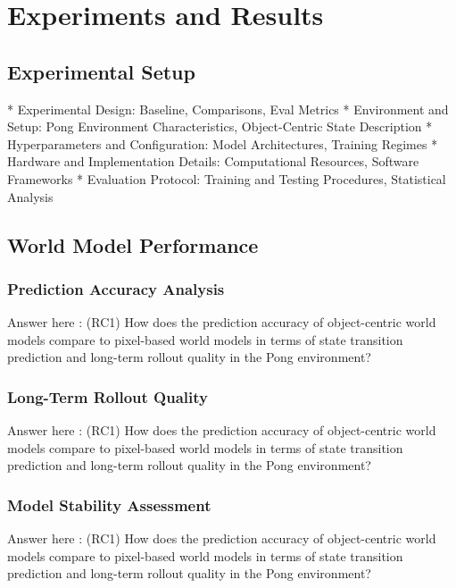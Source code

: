 \documentclass[
	english,
	ruledheaders=section,
	class=report,
	thesis={type=master},
	accentcolor=9c,
	custommargins=true,
	marginpar=false,
	parskip=half-,
	fontsize=11pt,
]{tudapub}
\begin{document}
\chapter{Experiments and Results}
\label{chap:experiments}



\section{Experimental Setup}
\label{sec:exp_setup}
* Experimental Design: Baseline, Comparisons, Eval Metrics
* Environment and Setup: Pong Environment Characteristics, Object-Centric State Description 
* Hyperparameters and Configuration: Model Architectures, Training Regimes
* Hardware and Implementation Details: Computational Resources, Software Frameworks
* Evaluation Protocol: Training and Testing Procedures, Statistical Analysis

\section{World Model Performance}
\label{sec:world_model_perf}

\subsection{Prediction Accuracy Analysis}
\label{subsec:prediction_accuracy}
Answer here : (RC1) How does the prediction accuracy of object-centric world models compare to pixel-based world models in terms of state transition prediction and long-term rollout quality in the Pong environment?

\subsection{Long-Term Rollout Quality}
\label{subsec:rollout_quality}
Answer here : (RC1) How does the prediction accuracy of object-centric world models compare to pixel-based world models in terms of state transition prediction and long-term rollout quality in the Pong environment?

\subsection{Model Stability Assessment}
\label{subsec:stability}
Answer here : (RC1) How does the prediction accuracy of object-centric world models compare to pixel-based world models in terms of state transition prediction and long-term rollout quality in the Pong environment?
\end{document}
